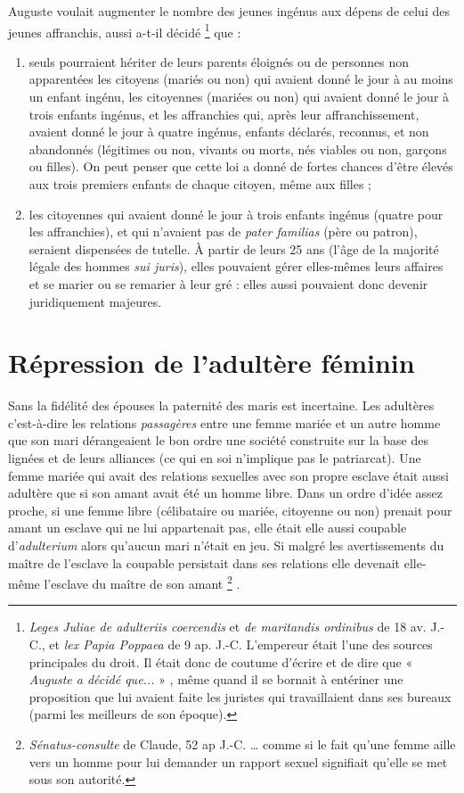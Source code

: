  Auguste voulait augmenter le nombre des jeunes ingénus aux dépens de celui des jeunes affranchis, aussi a-t-il décidé%
\footnote{\emph{Leges Juliae de adulteriis coercendis} et \emph{de maritandis ordinibus} de 18 av. J.-C., et \emph{lex Papia Poppaea} de 9 ap. J.-C. L'empereur était l'une des sources principales du droit. Il était donc de coutume d'écrire et de dire que « \emph{Auguste a décidé que...} » , même quand il se bornait à entériner une proposition que lui avaient faite les juristes qui travaillaient dans ses bureaux (parmi les meilleurs de son époque).}
que :
\begin{enumerate}
\item seuls pourraient hériter de leurs parents éloignés ou de personnes non apparentées les citoyens (mariés ou non) qui avaient donné le jour à au moins un enfant ingénu, les citoyennes (mariées ou non) qui avaient donné le jour à trois enfants ingénus, et les affranchies qui, après leur affranchissement, avaient donné le jour à quatre ingénus, enfants déclarés, reconnus, et non abandonnés (légitimes ou non, vivants ou morts, nés viables ou non, garçons ou filles). On peut penser que cette loi a donné de fortes chances d'être élevés aux trois premiers enfants de chaque citoyen, même aux filles ;
\item les citoyennes qui avaient donné le jour à trois enfants ingénus (quatre pour les affranchies), et qui n'avaient pas de \emph{pater familias} (père ou patron), seraient dispensées de tutelle. À partir de leurs 25 ans (l'âge de la majorité légale des hommes \emph{sui juris}), elles pouvaient gérer elles-mêmes leurs affaires et se marier ou se remarier à leur gré : elles aussi pouvaient donc devenir juridiquement majeures. 
\end{enumerate}

\section{Répression de l'adultère féminin}

 Sans la fidélité des épouses la paternité des maris est incertaine. Les adultères c'est-à-dire les relations \emph{passagères} entre une femme mariée et un autre homme que son mari dérangeaient le bon ordre une société construite sur la base des lignées et de leurs alliances (ce qui en soi n'implique pas le patriarcat). Une femme mariée qui avait des relations sexuelles avec son propre esclave était aussi adultère que si son amant avait été un homme libre. Dans un ordre d'idée assez proche, si une femme libre (célibataire ou mariée, citoyenne ou non) prenait pour amant un esclave qui ne lui appartenait pas, elle était elle aussi coupable d'\emph{adulterium} alors qu'aucun mari n'était en jeu. Si malgré les avertissements du maître de l'esclave la coupable persistait dans ses relations elle devenait elle-même l'esclave du maître de son amant%
\footnote{\emph{Sénatus-consulte} de Claude, 52 ap J.-C. … comme si le fait qu'une femme aille vers un homme pour lui demander un rapport sexuel signifiait qu'elle se met sous son autorité.}%
.

